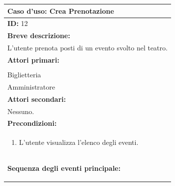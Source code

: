 \documentclass{article}
\begin{document}
                \begin{table}[H]
                    \begin{tabular}{|p{\linewidth}|}
                        \hline
                        \cellcolor{gray!100}
                        \color{white}
                        \centerline{\textbf{Caso d'uso:} Crea Prenotazione} \\
                        \hline
                        \textbf{ID:} 12 \\
                        \hline
                        \cellcolor{gray!20}
                        \textbf{Breve descrizione:} \\
                        \cellcolor{gray!20}
                        L'utente prenota posti di un evento svolto nel teatro. \\
                        \hline
                        \textbf{Attori primari:} \\
                        \begin{minipage}{\linewidth}
                            Cliente \\
                            Biglietteria \\
                            Amministratore
                        \end{minipage}
                        \vspace{0pt} \\
                        \hline
                        \textbf{Attori secondari:} \\                        
                        Nessuno. \\
                        \hline
                        \cellcolor{gray!20}
                        \textbf{Precondizioni:} \\
                        \cellcolor{gray!20}
                        \begin{minipage}{\linewidth}
                            \begin{enumerate}
                                \item L'utente visualizza l'elenco degli eventi. %
                            \end{enumerate}
                        \end{minipage} \\
                        \hline
                        \textbf{Sequenza degli eventi principale:}
                        \begin{enumerate}

\end{enumerate}
\end{tabular}
\end{table}
\end{document}
